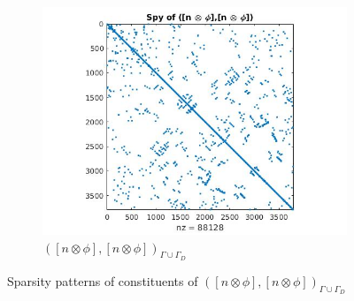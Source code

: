 \documentclass[a4paper]{book}
\begin{document}
\begin{figure}[H]
\begin{subfigure}{\textwidth}
  \includegraphics[width=\textwidth]{figure2.jpg}
  \caption{$([n \otimes \phi],[n \otimes \phi])_{\Gamma \cup \Gamma_D}$}
  \label{fig:figure2}
\end{subfigure}
\caption{Sparsity patterns of constituents of $([n \otimes \phi],[n \otimes \phi])_{\Gamma \cup \Gamma_D}$}
\caption{\label{figure_2_all}}
\end{figure}
\end{document}
